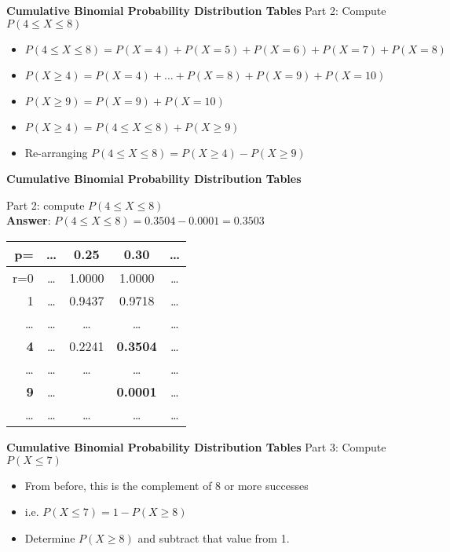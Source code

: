 \documentclass[a4]{beamer}
\begin{document}
{
\textbf{Cumulative Binomial Probability Distribution Tables}
\normalsize
Part 2: Compute $P(4 \leq X \leq 8)$  \\ \bigskip
\begin{itemize}
\item $P(4 \leq X \leq 8) = P(X = 4) + P(X = 5) + P(X = 6) + P(X = 7) + P(X=8)$
\bigskip
\item $P(X \geq 4) = P(X = 4) +  \ldots + P(X=8) + P(X=9) + P(X=10)$
\bigskip
\item $P(X \geq 9) = P(X = 9) + P(X = 10)$
\bigskip
\item $P(X \geq 4) = P(4 \leq X \leq 8) + P(X \geq 9)$
\bigskip
\item Re-arranging $P(4 \leq X \leq 8) = P(X \geq 4) - P(X \geq 9)$
\end{itemize}
}
{
\textbf{Cumulative Binomial Probability Distribution Tables}
\normalsize

Part 2:  compute $P(4 \leq X \leq 8)$ \\ \textbf{Answer}: $P(4 \leq X \leq 8)  = 0.3504-0.0001 = 0.3503$

\begin{center}
\begin{tabular}{|r||c|c|c|c|}
  \hline
  p= & \ldots & 0.25 & \textbf{0.30} &  \ldots\\ \hline \hline
  r=0 & \ldots & 1.0000 & 1.0000 & \ldots\\
   1 & \ldots & 0.9437 & 0.9718 & \ldots \\
  \ldots & \ldots & \ldots & \ldots&\ldots \\
  \textbf{4} & \ldots & 0.2241 & \alert{\textbf{0.3504}} &\ldots \\
 \ldots & \ldots & \ldots & \ldots&\ldots \\
   \textbf{9} & \ldots &  & \alert{\textbf{0.0001}} &\ldots \\
 \ldots & \ldots & \ldots & \ldots&\ldots \\
  \hline
\end{tabular}
\end{center}

}


{
\textbf{Cumulative Binomial Probability Distribution Tables}
\normalsize
Part 3: Compute $P(X \leq 7)$
\begin{itemize}
\item From before, this is the complement of 8 or more successes \item i.e. $P(X \leq 7) = 1 - P(X \geq 8)$
\item Determine $P(X \geq 8)$ and subtract that value from 1.
\end{itemize}
}
\end{document}
